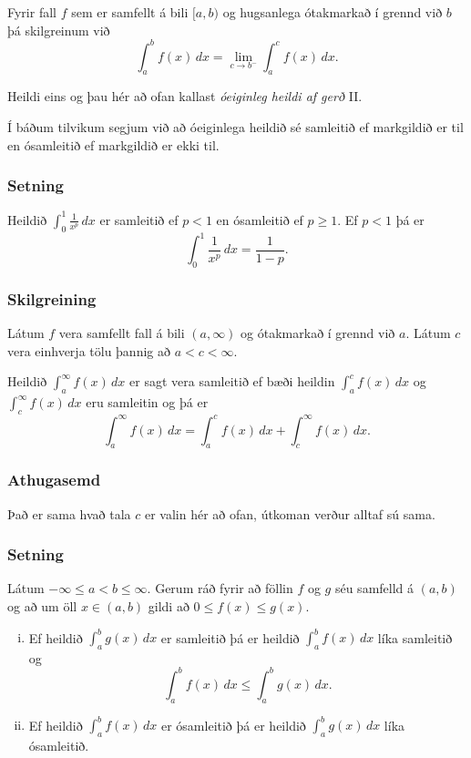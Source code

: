 \documentclass[icelandic,a4paper,12pt]{article}
\begin{document}
Fyrir fall $f$ sem er samfellt á bili $[a, b)$
og hugsanlega ótakmarkað í grennd við $b$  þá skilgreinum við
$$\int_a^b f(x)\,dx=\lim_{c\rightarrow b^-} \int_a^c f(x)\,dx.$$

Heildi eins og þau hér að ofan kallast \emph{óeiginleg heildi af gerð} II.

Í báðum tilvikum segjum við að óeiginlega heildið sé samleitið ef
markgildið er til en ósamleitið ef markgildið er ekki til.

\subsubsection{Setning} 
Heildið $\int_0^1 \frac{1}{x^p}\,dx$ er samleitið ef $p<1$ 
en ósamleitið ef $p\geq 1$. Ef $p<1$ þá er 
$$
\int_0^1
\frac{1}{x^p}\,dx=\frac{1}{1-p}.
$$

\subsubsection{Skilgreining}  
Látum $f$ vera samfellt fall á bili $(a,\infty)$ og ótakmarkað í grennd við $a$. 
Látum $c$ vera einhverja tölu þannig að $a<c<\infty$.  

Heildið $\int_a^\infty f(x)\,dx$ er sagt vera samleitið ef bæði heildin $\int_a^c f(x)\,dx$
og $\int_c^\infty f(x)\,dx$ eru samleitin og þá er 
$$
\int_{a}^\infty f(x)\,dx=\int_{a}^c f(x)\,dx + \int_c^\infty f(x)\,dx.$$

\subsubsection{Athugasemd}
Það er sama hvað tala $c$ er valin hér að ofan, útkoman verður alltaf sú sama.

\subsubsection{Setning}
Látum $-\infty\leq a<b\leq \infty$.  Gerum ráð fyrir að föllin $f$ og
$g$ séu samfelld á $(a, b)$ og að um öll $x\in (a, b)$ gildi að
$0\leq f(x)\leq g(x)$. 
\begin{enumerate}[(i)]
\item Ef heildið $\int_a^b g(x)\,dx$ er samleitið þá er heildið $\int_a^b f(x)\,dx$ líka samleitið og 
$$\int_a^b f(x)\,dx \leq \int_a^b g(x)\,dx.$$
\item Ef heildið $\int_a^b f(x)\,dx$ er ósamleitið þá er heildið $\int_a^b g(x)\,dx$ líka ósamleitið.
\end{enumerate} 
\end{document}
